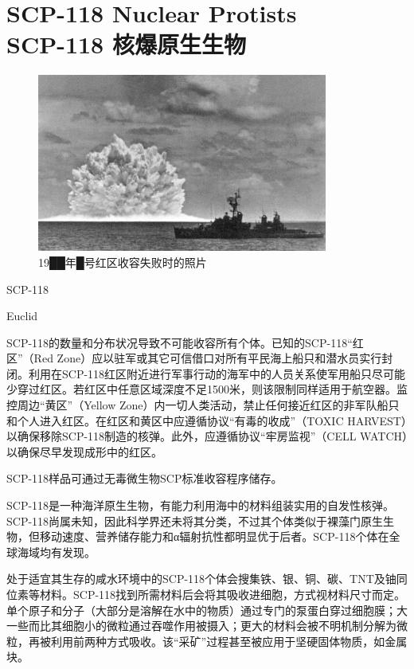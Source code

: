 \chapter[SCP-118 核爆原生生物]{
    SCP-118 Nuclear Protists\\
    SCP-118 核爆原生生物
}

\label{chap:SCP-118}

\begin{figure}[H]
    \centering
    \includegraphics[width=0.5\linewidth]{images/SCP-118.jpg}
    \caption*{19██年█号红区收容失败时的照片}
\end{figure}

SCP-118

Euclid

SCP-118的数量和分布状况导致不可能收容所有个体。已知的SCP-118“红区”（Red Zone）应以驻军或其它可信借口对所有平民海上船只和潜水员实行封闭。利用在SCP-118红区附近进行军事行动的海军中的人员关系使军用船只尽可能少穿过红区。若红区中任意区域深度不足1500米，则该限制同样适用于航空器。监控周边“黄区”（Yellow Zone）内一切人类活动，禁止任何接近红区的非军队船只和个人进入红区。在红区和黄区中应遵循协议“有毒的收成”（TOXIC HARVEST）以确保移除SCP-118制造的核弹。此外，应遵循协议“牢房监视”（CELL WATCH）以确保尽早发现成形中的红区。

SCP-118样品可通过无毒微生物SCP标准收容程序储存。

SCP-118是一种海洋原生生物，有能力利用海中的材料组装实用的自发性核弹。SCP-118尚属未知，因此科学界还未将其分类，不过其个体类似于裸藻门原生生物，但移动速度、营养储存能力和α辐射抗性都明显优于后者。SCP-118个体在全球海域均有发现。

处于适宜其生存的咸水环境中的SCP-118个体会搜集铁、银、铜、碳、TNT及铀同位素等材料。SCP-118找到所需材料后会将其吸收进细胞，方式视材料尺寸而定。单个原子和分子（大部分是溶解在水中的物质）通过专门的泵蛋白穿过细胞膜；大一些而比其细胞小的微粒通过吞噬作用被摄入；更大的材料会被不明机制分解为微粒，再被利用前两种方式吸收。该“采矿”过程甚至被应用于坚硬固体物质，如金属块。

